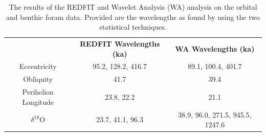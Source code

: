 \documentclass[12pt, onecolumn]{revtex4}    %
\begin{document}
\begin{table}[h!]
\centering
\begin{tabular}{c@{\hskip 20pt}c@{\hskip 20pt}c} 
 \hline
  & \textbf{REDFIT Wavelengths (ka)} & \textbf{WA Wavelengths (ka)} \\ [0.5ex] 
 Eccentricity & 95.2, 128.2, 416.7 & 89.1, 100.4,  401.7\\
 Obliquity & 41.7 & 39.4 \\
 Perihelion Longitude & 23.8, 22.2 & 21.1 \\
 $\delta^{18}$O & 23.7, 41.1, 96.3  & 38.9, 96.0, 271.5, 945.5, 1247.6 \\
 \hline
\end{tabular}
\caption{The results of the REDFIT and Wavelet Analysis (WA) analysis on the orbital and benthic foram data. Provided are the wavelengths as found by using the two statistical techniques.}
\vspace{-0.5em}
\label{table:final_results}
\end{table}
\end{document}
